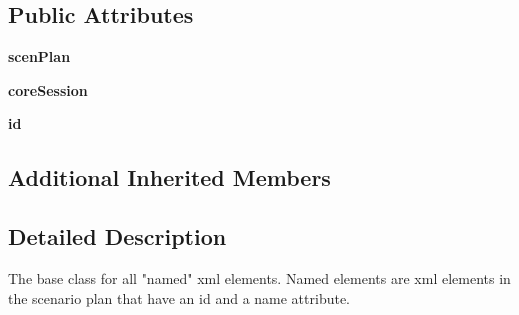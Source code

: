 \subsection*{Public Attributes}
\begin{DoxyCompactItemize}
\item 
\hypertarget{classcore_1_1misc_1_1xmlwriter1_1_1_named_xml_element_a27adff6fac1b669f914fdc74b02a7977}{{\bfseries scen\+Plan}}\label{classcore_1_1misc_1_1xmlwriter1_1_1_named_xml_element_a27adff6fac1b669f914fdc74b02a7977}

\item 
\hypertarget{classcore_1_1misc_1_1xmlwriter1_1_1_named_xml_element_a5d54cb2f805aa201128ebc6b6ac5043f}{{\bfseries core\+Session}}\label{classcore_1_1misc_1_1xmlwriter1_1_1_named_xml_element_a5d54cb2f805aa201128ebc6b6ac5043f}

\item 
\hypertarget{classcore_1_1misc_1_1xmlwriter1_1_1_named_xml_element_a25bb4eafb0190dddc9d88758d621bf7c}{{\bfseries id}}\label{classcore_1_1misc_1_1xmlwriter1_1_1_named_xml_element_a25bb4eafb0190dddc9d88758d621bf7c}

\end{DoxyCompactItemize}
\subsection*{Additional Inherited Members}


\subsection{Detailed Description}
\begin{DoxyVerb}The base class for all "named" xml elements. Named elements are
xml elements in the scenario plan that have an id and a name attribute.
\end{DoxyVerb}
 


